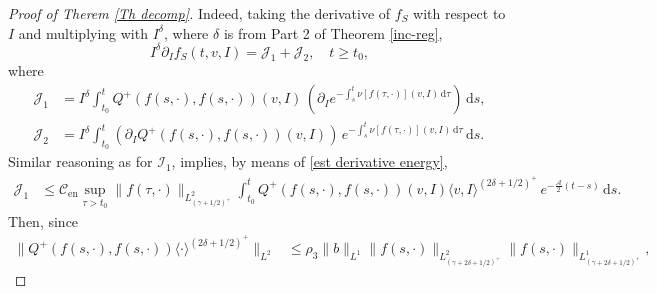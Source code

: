 \documentclass[11pt,a4paper]{amsart}
\newcommand{\md}{\mathrm{d}}
\newcommand{\g}{\gamma}
\newcommand{\la}{\langle}
\newcommand{\ra}{\rangle}
\newcommand{\Ls}{L^1}
\newcommand{\cb}{\mathcal{C}}
\newcommand{\mA}{\mathcal{A}}
\newcommand{\fS}{f_S}
\newcommand{\Clen}{\mathcal{C}_{\text{en}}}
\begin{document}
\begin{proof}[Proof of Therem \ref{Th decomp}]
Indeed, taking the derivative of $\fS$  with respect to $I$ and multiplying with $I^\delta$,  where $\delta$ is from Part 2 of Theorem \ref{inc-reg}, 
 \begin{equation}\label{fS I}
	I^\delta \partial_{I}	\fS(t,v,I)  = \mathcal{J}_1 + \mathcal{J}_2, \quad t\geq t_0,
\end{equation}
where 
\begin{equation*}
	\begin{split}
		\mathcal{J}_1  &  =  I^\delta \int_{t_0}^t  Q^+(f(s,\cdot),f(s,\cdot))(v,I) \, \left( \partial_{I} e^{-\int_s^t 	\nu[f(\tau,\cdot)](v,I) \, \md \tau} \right) \, \md s, \\ 
		\mathcal{J}_2 & = I^\delta  \int_{t_0}^t \left(  \partial_{I} Q^+(f(s,\cdot),f(s,\cdot))(v,I) \right) \, e^{-\int_s^t 	\nu[f(\tau,\cdot)](v,I) \, \md \tau} \, \md s.
	\end{split}
\end{equation*}
Similar reasoning as for $\mathcal{I}_1$, implies, by means of \eqref{est derivative energy}, 
\begin{equation*}
	\begin{split}
		\mathcal{J}_1  
		& \leq  \Clen \sup_{\tau>t_0}	\| f(\tau,\cdot) \|_{L^{2}_{(\g+1/2)^+}}    \int_{t_0}^t  Q^+(f(s,\cdot),f(s,\cdot))(v,I) \la v, I \ra^{(2\delta + 1/2)^+}   \,  e^{- \frac{\mA}{2} (t-s)     }     \, \md s. 
	\end{split}
\end{equation*}
Then, since
 \begin{equation*}
 	\begin{split}
 		\|  Q^+(f(s,\cdot),f(s,\cdot)) \la \cdot \ra^{(2\delta + 1/2)^+}   \|_{L^2} & \leq 	    \rho_3	\| b \|_{\Ls}   \|  {f}(s,\cdot)    \|_{L^2_{(\g+2\delta+1/2)^+}}  \|  	{f}(s,\cdot)    \|_{L^1_{(\g+2\delta+1/2)^+}},

\end{split}
\end{equation*}
\end{proof}
\end{document}
